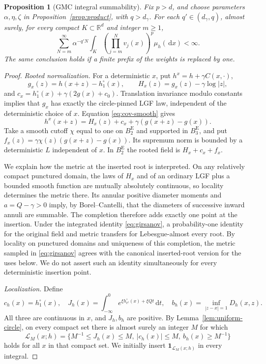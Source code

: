 \documentclass[11pt,reqno]{amsart}
\theoremstyle{plain}
\newtheorem{proposition}[theorem]{Proposition}
\theoremstyle{definition}
\theoremstyle{remark}
\newcommand{\R}{\mathbb R}
\newcommand{\1}{\mathbf{1}}
\newcommand{\dd}{\,\mathrm d}
\newcommand{\Be}{B^{\mathrm E}}
\begin{document}
\begin{proposition}[GMC integral summability]\label{prop:integrals}
Fix $p>d$, and choose parameters $\alpha,\eta,\zeta$ in Proposition~\ref{prop:product}, with $q>d_\gamma$. For each $q'\in(d_\gamma,q)$, almost surely, for every compact $K\subset\R^d$ and integer $m\ge1$,
\begin{equation}\label{eq:integral-bound}
\sum_{N=m}^\infty\alpha^{-q'N}
\int_K\left(\prod_{j=m}^N v_j(x)\right)^p\mu_h(\dd x)<\infty.
\end{equation}
The same conclusion holds if a finite prefix of the weights is replaced by one.
\end{proposition}
\begin{proof}
\emph{Rooted normalization.} For a deterministic $x$, put $h^x=h+\gamma C(x,\cdot)$,
\[
g_x(z)=h(x+z)-h_1^\circ(x),\qquad
H_x(z)=g_x(z)-\gamma\log|z|,
\]
and $c_x=h_1^\circ(x)+\gamma(2g(x)+c_0)$. Translation invariance modulo constants implies that $g_x$ has exactly the circle-pinned LGF law, independent of the deterministic choice of $x$. Equation \eqref{eq:cov-smooth} gives
\begin{equation}\label{eq:root-field}
h^x(x+z)=H_x(z)+c_x+\gamma(g(x+z)-g(x)).
\end{equation}
Take a smooth cutoff $\chi$ equal to one on $\Be_2$ and supported in $\Be_3$, and put
$f_x(z)=\gamma\chi(z)(g(x+z)-g(x))$. Its supremum norm is bounded by a deterministic $L$ independent of $x$. In $\Be_2$ the rooted field is $H_x+c_x+f_x$.

We explain how the metric at the inserted root is interpreted. On any relatively compact punctured domain, the laws of $H_x$ and of an ordinary LGF plus a bounded smooth function are mutually absolutely continuous, so locality determines the metric there. Its annular positive diameter moments and $a=Q-\gamma>0$ imply, by Borel--Cantelli, that the diameters of successive inward annuli are summable. The completion therefore adds exactly one point at the insertion. Under the integrated identity \eqref{eq:girsanov}, a probability-one identity for the original field and metric transfers for Lebesgue-almost every root. By locality on punctured domains and uniqueness of this completion, the metric sampled in \eqref{eq:girsanov} agrees with the canonical inserted-root version for the uses below. We do not assert such an identity simultaneously for every deterministic insertion point.

\emph{Localization.} Define
\[
c_h(x)=h_1^\circ(x),\quad J_h(x)=\int_{-\infty}^0e^{\xi h_{e^t}^\circ(x)+\xi Qt}\dd t,\quad
b_h(x)=\inf_{|z-x|=1}D_h(x,z).
\]
All three are continuous in $x$, and $J_h,b_h$ are positive. By Lemma~\ref{lem:uniform-circle}, on every compact set there is almost surely an integer $M$ for which
\begin{equation}\label{eq:localize}
\mathcal L_M(x;h)=\{M^{-1}\le J_h(x)\le M,\ |c_h(x)|\le M,\ b_h(x)\ge M^{-1}\}
\end{equation}
holds for all $x$ in that compact set. We initially insert $\1_{\mathcal L_M(x;h)}$ in every integral.


\end{proof}
\end{document}
